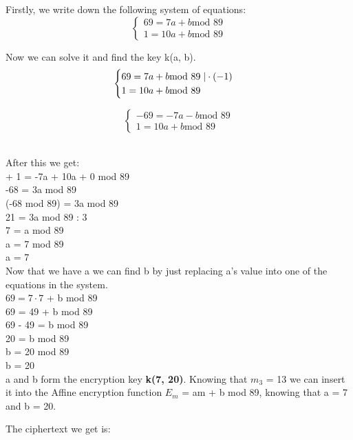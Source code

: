 \documentclass[12pt]{article}
\begin{document}
\noindent Firstly, we write down the following system of equations:
$$\begin{cases}
    69 = 7a + b \text{mod 89} \\
    1 = 10a + b \text{mod 89} 
\end{cases}$$

Now we can solve it and find the key k(a, b). 
$$\begin{cases}
    69 = 7a + b \text{mod 89} \hspace{0.1cm} | \cdot (-1) \\
    1 = 10a + b \text{mod 89} 
\end{cases}$$

$$\begin{cases}
    -69 = -7a - b \text{mod 89} \\
    1 = 10a + b \text{mod 89} 
\end{cases}$$

\noindent \\After this we get: \\

 + 1 = -7a + 10a + 0 mod 89 \\
-68 = 3a mod 89 \\
(-68 mod 89) = 3a mod 89 \\
21 = 3a mod 89 \textbar{} : 3\\
7 = a mod 89 \\
a = 7 mod 89 \\
a = 7 \\

\noindent Now that we have a we can find b by just replacing a's value into one of the equations in the system. \\

\noindent $69 = 7 \cdot 7$ + b mod 89 \\
69 = 49 + b mod 89 \\
69 - 49 = b mod 89 \\
20 = b mod 89 \\
b = 20 mod 89 \\
b = 20 \\

\noindent a and b form the encryption key \textbf{k(7, 20)}.
Knowing that $m_3$ = 13 we can insert it into the Affine encryption function
$E_m$ = am + b mod 89, knowing that a = 7 and b = 20. \\
\pagebreak

\noindent The ciphertext we get is: \\
\end{document}
